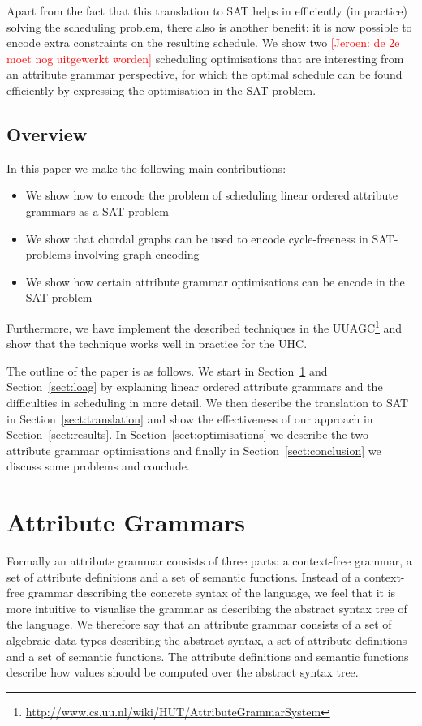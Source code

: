 \documentclass{llncs}
\newif\iffinal\finalfalse
\newcommand{\REM}[3]{\iffinal\else\textcolor{#2}{[#1: #3]}\fi}
\newcommand{\Jeroen}[1]{\REM{Jeroen}{red}{#1}}
\newcommand{\sectref}[1]{Section~\ref{#1}}
\begin{document}
Apart from the fact that this translation to SAT helps in efficiently (in practice) solving the scheduling problem, there also is another benefit: it is now possible to encode extra constraints on the resulting schedule. We show two \Jeroen{de 2e moet nog uitgewerkt worden} scheduling optimisations that are interesting from an attribute grammar perspective, for which the optimal schedule can be found efficiently by expressing the optimisation in the SAT problem.

\subsection{Overview}
In this paper we make the following main contributions:
\begin{itemize}
\item We show how to encode the problem of scheduling linear ordered attribute grammars as a SAT-problem
\item We show that chordal graphs can be used to encode cycle-freeness in SAT-problems involving graph encoding
\item We show how certain attribute grammar optimisations can be encode in the SAT-problem
\end{itemize}
Furthermore, we have implement the described techniques in the UUAGC\footnote{\url{http://www.cs.uu.nl/wiki/HUT/AttributeGrammarSystem}} \cite{combinator-languages} and show that the technique works well in practice for the UHC.

The outline of the paper is as follows. We start in \sectref{sect:ag} and \sectref{sect:loag} by explaining linear ordered attribute grammars and the difficulties in scheduling in more detail. We then describe the translation to SAT in \sectref{sect:translation} and show the effectiveness of our approach in \sectref{sect:results}. In \sectref{sect:optimisations} we describe the two attribute grammar optimisations and finally in \sectref{sect:conclusion} we discuss some problems and conclude.


\section{Attribute Grammars} \label{sect:ag}
Formally an attribute grammar consists of three parts: a context-free grammar, a set of attribute definitions and a set of semantic functions. Instead of a context-free grammar describing the concrete syntax of the language, we feel that it is more intuitive to visualise the grammar as describing the abstract syntax tree of the language. We therefore say that an attribute grammar consists of a set of algebraic data types describing the abstract syntax, a set of attribute definitions and a set of semantic functions. The attribute definitions and semantic functions describe how values should be computed over the abstract syntax tree.
\end{document}
